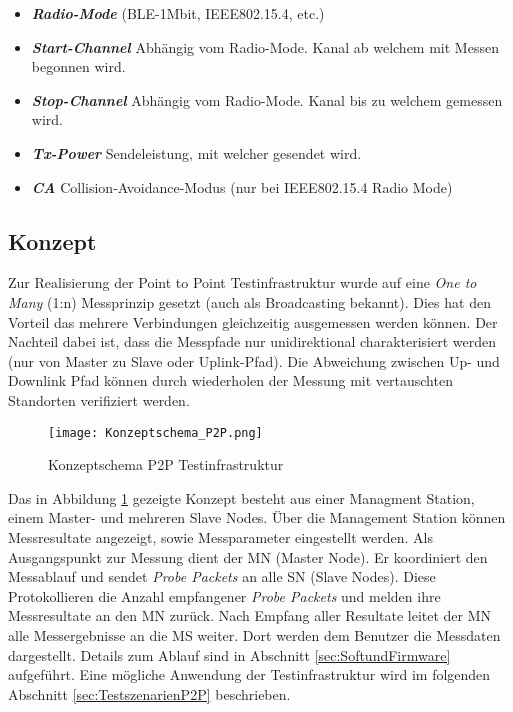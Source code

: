 \begin{itemize}
	\item \textit{\textbf{Radio-Mode}} (BLE-1Mbit, IEEE802.15.4, etc.)
	\item \textit{\textbf{Start-Channel}} Abhängig vom Radio-Mode. Kanal ab welchem mit Messen begonnen wird.
	\item \textit{\textbf{Stop-Channel}} Abhängig vom Radio-Mode. Kanal bis zu welchem gemessen wird. 
	\item \textit{\textbf{Tx-Power}} Sendeleistung, mit welcher gesendet wird. 
	\item \textit{\textbf{CA}} Collision-Avoidance-Modus (nur bei IEEE802.15.4 Radio Mode)
\end{itemize}


\subsection{Konzept}\label{sec:KonzeptP2P}

Zur Realisierung der Point to Point Testinfrastruktur wurde auf eine \textit{One to Many} (1:n) Messprinzip gesetzt (auch als Broadcasting bekannt). Dies hat den Vorteil das mehrere Verbindungen gleichzeitig ausgemessen werden können. Der Nachteil dabei ist, dass die Messpfade nur unidirektional charakterisiert werden (nur von Master zu Slave oder Uplink-Pfad). Die Abweichung zwischen Up- und Downlink Pfad können durch wiederholen der Messung mit vertauschten Standorten verifiziert werden. 

\begin{figure} [H]
	\centering
	\texttt{[image: Konzeptschema\_P2P.png]}
	\caption{Konzeptschema P2P Testinfrastruktur}
	\label{fig:KonzeptschemaP2P}
\end{figure}

Das in Abbildung \ref{fig:KonzeptschemaP2P} gezeigte Konzept besteht aus einer Managment Station, einem Master- und mehreren Slave Nodes. Über die Management Station können Messresultate angezeigt, sowie Messparameter eingestellt werden. Als Ausgangspunkt zur Messung dient der MN (Master Node). Er koordiniert den Messablauf und sendet \textit{Probe Packets} an alle SN (Slave Nodes). Diese Protokollieren die Anzahl empfangener \textit{Probe Packets} und melden ihre Messresultate an den MN zurück. Nach Empfang aller Resultate leitet der MN alle Messergebnisse an die MS weiter. Dort werden dem Benutzer die Messdaten dargestellt. Details zum Ablauf sind in Abschnitt \ref{sec:SoftundFirmware} aufgeführt. Eine mögliche Anwendung der Testinfrastruktur wird im folgenden Abschnitt \ref{sec:TestszenarienP2P} beschrieben.  

